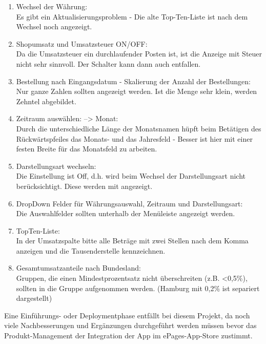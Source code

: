 \begin{enumerate}
\item Wechsel der Währung:\\
Es gibt ein Aktualisierungsproblem - Die alte Top-Ten-Liste ist nach dem Wechsel noch angezeigt.
\item Shopumsatz und Umsatzsteuer ON/OFF:\\
Da die Umsatzsteuer ein durchlaufender Posten ist, ist die Anzeige mit Steuer nicht sehr sinnvoll. Der Schalter kann dann auch entfallen.
\item Bestellung nach Eingangsdatum - Skalierung der Anzahl der Bestellungen:\\
Nur ganze Zahlen sollten angezeigt werden. Ist die Menge sehr klein, werden Zehntel abgebildet.
\item Zeitraum auswählen: --> Monat:\\
Durch die unterschiedliche Länge der Monatsnamen hüpft beim Betätigen des Rückwärtspfeiles das Monats- und das Jahresfeld - Besser ist hier mit einer festen Breite für das Monatsfeld zu arbeiten.
\item Darstellungsart wechseln:\\
Die Einstellung  ist Off, d.h. wird beim Wechsel der Darstellungsart nicht berücksichtigt. Diese werden mit angezeigt.
\item DropDown Felder für Währungsauswahl, Zeitraum und Darstellungsart:\\
Die Auswahlfelder sollten unterhalb der Menüleiste angezeigt werden.
\item TopTen-Liste:\\
In der Umsatzspalte bitte alle Beträge mit zwei Stellen nach dem Komma anzeigen und die Tausenderstelle kennzeichnen.
\item Gesamtumsatzanteile nach Bundesland:\\
Gruppen, die einen Mindestprozentsatz nicht überschreiten (z.B. <0,5\%), sollten in die Gruppe  aufgenommen werden. (Hamburg mit 0,2\% ist separiert dargestellt)
\end{enumerate}

Eine Einführungs- oder Deploymentphase entfällt bei diesem Projekt, da noch viele Nachbesserungen und Ergänzungen durchgeführt werden müssen bevor das Produkt-Management der Integration der App im ePages-App-Store zustimmt.



